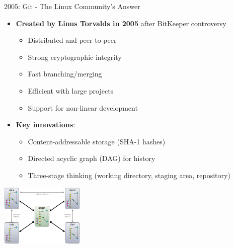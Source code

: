 \documentclass{beamer}
\begin{document}
\begin{frame}[t]{2005: Git - The Linux Community's Answer}
\begin{itemize}
    \item \textbf{Created by Linus Torvalds in 2005} after BitKeeper controversy
        \begin{itemize}
            \item Distributed and peer-to-peer
            \item Strong cryptographic integrity
            \item Fast branching/merging
            \item Efficient with large projects
            \item Support for non-linear development
        \end{itemize}
    \item \textbf{Key innovations}:
        \begin{itemize}
            \item Content-addressable storage (SHA-1 hashes)
            \item Directed acyclic graph (DAG) for history
            \item Three-stage thinking (working directory, staging area, repository)
        \end{itemize}
\end{itemize}
\begin{center}
    \includegraphics[width=0.3\textwidth]{images/git-dist.png}
\end{center}
\end{frame}
\end{document}
